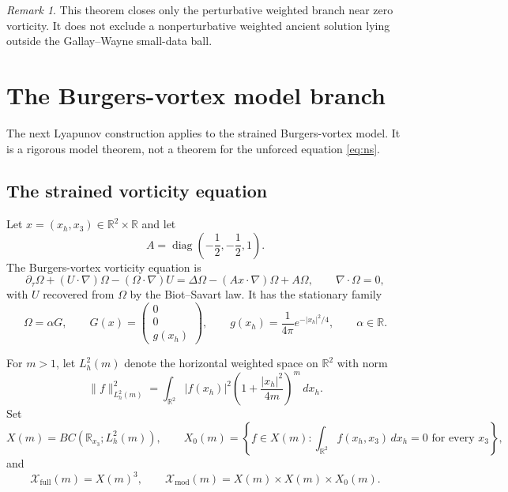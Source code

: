 \documentclass[11pt]{amsart}
\theoremstyle{plain}
\theoremstyle{definition}
\theoremstyle{remark}
\newtheorem{remark}[theorem]{Remark}
\numberwithin{equation}{section}
\begin{document}
\begin{remark}
This theorem closes only the perturbative weighted branch near zero vorticity.
It does not exclude a nonperturbative weighted ancient solution lying outside
the Gallay--Wayne small-data ball.
\end{remark}

\section{The Burgers-vortex model branch}

The next Lyapunov construction applies to the strained Burgers-vortex model.
It is a rigorous model theorem, not a theorem for the unforced equation
\eqref{eq:ns}.

\subsection{The strained vorticity equation}

Let \(x=(x_h,x_3)\in\mathbb R^2\times\mathbb R\) and let
\[
   A=\operatorname{diag}\left(-\frac12,-\frac12,1\right).
\]
The Burgers-vortex vorticity equation is
\begin{equation}\label{eq:burgers}
   \partial_\tau\Omega+(U\cdot\nabla)\Omega-(\Omega\cdot\nabla)U
   =
   \Delta\Omega-(Ax\cdot\nabla)\Omega+A\Omega,
   \qquad
   \nabla\cdot\Omega=0,
\end{equation}
with \(U\) recovered from \(\Omega\) by the Biot--Savart law.  It has the
stationary family
\begin{equation}\label{eq:burgers-family}
   \Omega=\alpha G,\qquad
   G(x)=\begin{pmatrix}0\\0\\g(x_h)\end{pmatrix},
   \qquad
   g(x_h)=\frac1{4\pi}e^{-|x_h|^2/4},
   \qquad \alpha\in\mathbb R .
\end{equation}

For \(m>1\), let \(L^2_h(m)\) denote the horizontal weighted space on
\(\mathbb R^2\) with norm
\[
   \|f\|_{L^2_h(m)}^2
   =
   \int_{\mathbb R^2}|f(x_h)|^2
   \left(1+\frac{|x_h|^2}{4m}\right)^m\,dx_h .
\]
Set
\[
   X(m)=BC(\mathbb R_{x_3};L^2_h(m)),\qquad
   X_0(m)=
   \left\{
      f\in X(m):
      \int_{\mathbb R^2}f(x_h,x_3)\,dx_h=0
      \text{ for every }x_3
   \right\},
\]
and
\[
   \mathcal X_{\mathrm{full}}(m)=X(m)^3,\qquad
   \mathcal X_{\mathrm{mod}}(m)=X(m)\times X(m)\times X_0(m).
\]
\end{document}
